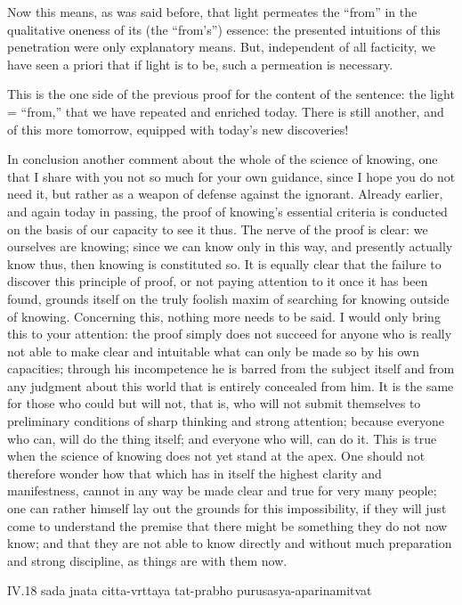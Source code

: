 Now this means, as was said before,
that light permeates the “from”
in the qualitative oneness of its (the “from's”) essence:
the presented intuitions of this penetration
were only explanatory means.
But, independent of all facticity,
we have seen a priori
that if light is to be,
such a permeation is necessary.

This is the one side of the previous proof
for the content of the sentence:
the light = “from,”
that we have repeated and enriched today.
There is still another,
and of this more tomorrow,
equipped with today's new discoveries!

In conclusion another comment about
the whole of the science of knowing,
one that I share with you not so much for your own guidance,
since I hope you do not need it,
but rather as a weapon of defense against the ignorant.
Already earlier, and again today in passing,
the proof of knowing's essential criteria is conducted
on the basis of our capacity to see it thus.
The nerve of the proof is clear:
we ourselves are knowing;
since we can know only in this way,
and presently actually know thus,
then knowing is constituted so.
It is equally clear that the failure
to discover this principle of proof,
or not paying attention to it once it has been found,
grounds itself on the truly foolish maxim
of searching for knowing outside of knowing.
Concerning this, nothing more needs to be said.
I would only bring this to your attention:
the proof simply does not succeed for anyone
who is really not able to make clear and intuitable
what can only be made so by his own capacities;
through his incompetence he is
barred from the subject itself
and from any judgment about this world
that is entirely concealed from him.
It is the same for those who could but will not, that is,
who will not submit themselves to preliminary conditions
of sharp thinking and strong attention;
because everyone who can, will do the thing itself;
and everyone who will, can do it.
This is true when the science of knowing
does not yet stand at the apex.
One should not therefore wonder
how that which has in itself
the highest clarity and manifestness,
cannot in any way be made clear and true
for very many people;
one can rather himself lay out
the grounds for this impossibility,
if they will just come to understand the premise
that there might be something they do not now know;
and that they are not able to know directly
and without much preparation and strong discipline,
as things are with them now.

IV.18
sada jnata citta-vrttaya tat-prabho purusasya-aparinamitvat

